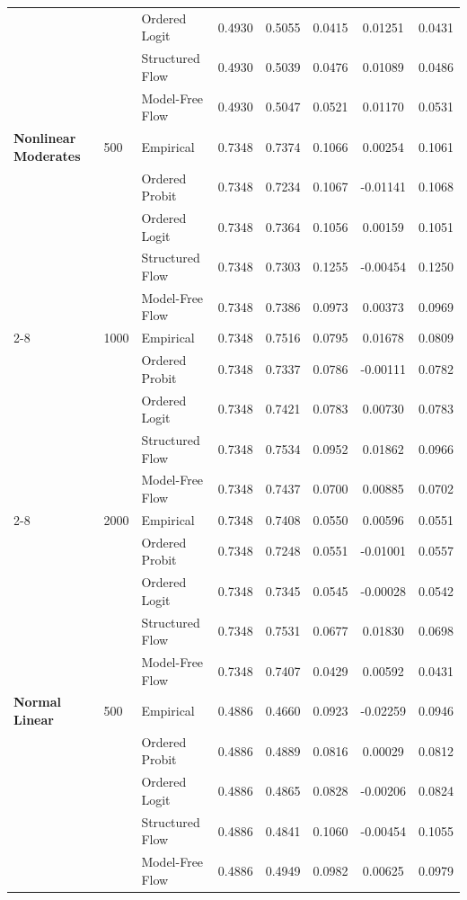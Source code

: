 \begin{table}[p]
\begin{tabular}{lllccccc}
 &  & Ordered Logit & 0.4930 & 0.5055 & 0.0415 & 0.01251 & 0.0431 \\
 &  & Structured Flow & 0.4930 & 0.5039 & 0.0476 & 0.01089 & 0.0486 \\
 &  & Model-Free Flow & 0.4930 & 0.5047 & 0.0521 & 0.01170 & 0.0531 \\
\midrule
\textbf{Nonlinear Moderates} & 500 & Empirical & 0.7348 & 0.7374 & 0.1066 & 0.00254 & 0.1061 \\
 &  & Ordered Probit & 0.7348 & 0.7234 & 0.1067 & -0.01141 & 0.1068 \\
 &  & Ordered Logit & 0.7348 & 0.7364 & 0.1056 & 0.00159 & 0.1051 \\
 &  & Structured Flow & 0.7348 & 0.7303 & 0.1255 & -0.00454 & 0.1250 \\
 &  & Model-Free Flow & 0.7348 & 0.7386 & 0.0973 & 0.00373 & 0.0969 \\
\cline{2-8}
 & 1000 & Empirical & 0.7348 & 0.7516 & 0.0795 & 0.01678 & 0.0809 \\
 &  & Ordered Probit & 0.7348 & 0.7337 & 0.0786 & -0.00111 & 0.0782 \\
 &  & Ordered Logit & 0.7348 & 0.7421 & 0.0783 & 0.00730 & 0.0783 \\
 &  & Structured Flow & 0.7348 & 0.7534 & 0.0952 & 0.01862 & 0.0966 \\
 &  & Model-Free Flow & 0.7348 & 0.7437 & 0.0700 & 0.00885 & 0.0702 \\
\cline{2-8}
 & 2000 & Empirical & 0.7348 & 0.7408 & 0.0550 & 0.00596 & 0.0551 \\
 &  & Ordered Probit & 0.7348 & 0.7248 & 0.0551 & -0.01001 & 0.0557 \\
 &  & Ordered Logit & 0.7348 & 0.7345 & 0.0545 & -0.00028 & 0.0542 \\
 &  & Structured Flow & 0.7348 & 0.7531 & 0.0677 & 0.01830 & 0.0698 \\
 &  & Model-Free Flow & 0.7348 & 0.7407 & 0.0429 & 0.00592 & 0.0431 \\
\midrule
\textbf{Normal Linear} & 500 & Empirical & 0.4886 & 0.4660 & 0.0923 & -0.02259 & 0.0946 \\
 &  & Ordered Probit & 0.4886 & 0.4889 & 0.0816 & 0.00029 & 0.0812 \\
 &  & Ordered Logit & 0.4886 & 0.4865 & 0.0828 & -0.00206 & 0.0824 \\
 &  & Structured Flow & 0.4886 & 0.4841 & 0.1060 & -0.00454 & 0.1055 \\
 &  & Model-Free Flow & 0.4886 & 0.4949 & 0.0982 & 0.00625 & 0.0979 \\

\end{tabular}
\end{table}
